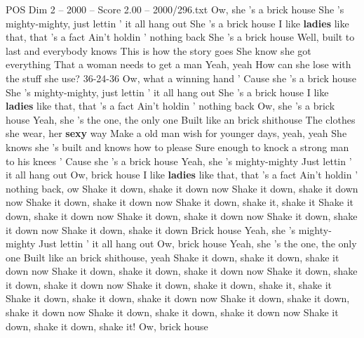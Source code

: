 \begin{textsample}{POS Dim 2 – 2000 – Score 2.00 – 2000/296.txt}  \label{ex:f2_pos_012}
Ow, she 's a brick house She 's mighty-mighty, just lettin ' it all hang out She 's a brick house I like \textbf{ladies} like that, that 's a fact Ain't holdin ' nothing back She 's a brick house Well, built to last and everybody knows This is how the story goes She know she got everything That a woman needs to get a man Yeah, yeah How can she lose with the stuff she use? 36-24-36 Ow, what a winning hand ' Cause she 's a brick house She 's mighty-mighty, just lettin ' it all hang out She 's a brick house I like \textbf{ladies} like that, that 's a fact Ain't holdin ' nothing back Ow, she 's a brick house Yeah, she 's the one, the only one Built like an brick shithouse The clothes she wear, her \textbf{sexy} way Make a old man wish for younger days, yeah, yeah She knows she 's built and knows how to please Sure enough to knock a strong man to his knees ' Cause she 's a brick house Yeah, she 's mighty-mighty Just lettin ' it all hang out Ow, brick house I like \textbf{ladies} like that, that 's a fact Ain't holdin ' nothing back, ow Shake it down, shake it down now Shake it down, shake it down now Shake it down, shake it down now Shake it down, shake it, shake it Shake it down, shake it down now Shake it down, shake it down now Shake it down, shake it down now Shake it down, shake it down Brick house Yeah, she 's mighty-mighty Just lettin ' it all hang out Ow, brick house Yeah, she 's the one, the only one Built like an brick shithouse, yeah Shake it down, shake it down, shake it down now Shake it down, shake it down, shake it down now Shake it down, shake it down, shake it down now Shake it down, shake it down, shake it, shake it Shake it down, shake it down, shake it down now Shake it down, shake it down, shake it down now Shake it down, shake it down, shake it down now Shake it down, shake it down, shake it!
Ow, brick house

\end{textsample}
